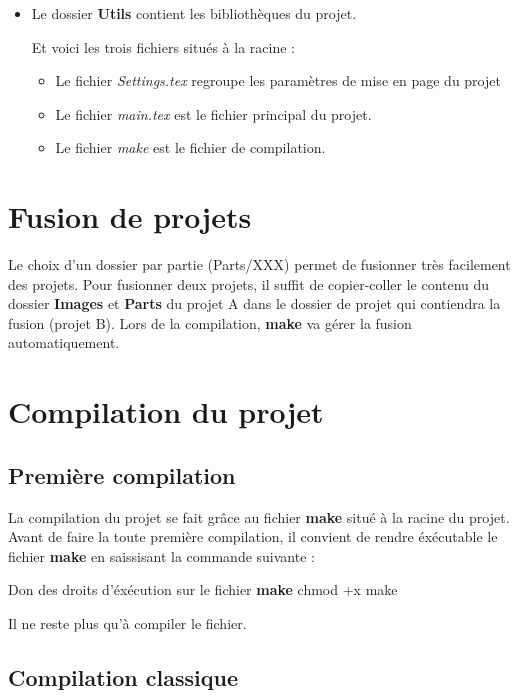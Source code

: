 \documentclass[12pt]{report}
\newcommand{\Triangle}{$\blacktriangleright$}
\newenvironment{items}[2]
{      
        \begin{itemize}[font=\color{#1}, label=#2]  
    }
    { 
        \end{itemize}
}%
\renewcommand{\bold}[1]{\textbf{#1}}
\newcommand{\italic}[1]{\textit{#1}}
\begin{document}
\begin{items}{blue}{\Triangle}
    \item Le dossier \bold{Utils} contient les bibliothèques du projet.

    Et voici les trois fichiers situés à la racine : 
    \begin{items}{black}{\Triangle}
        \item Le fichier \italic{Settings.tex} regroupe les paramètres de mise en page du projet
        \item Le fichier \italic{main.tex} est le fichier principal du projet.
        \item Le fichier \italic{make} est le fichier de compilation.
    \end{items}
\end{items}

\section{Fusion de projets}

Le choix d'un dossier par partie (Parts/XXX) permet de fusionner très facilement des projets.
Pour fusionner deux projets, il suffit de copier-coller le contenu du dossier \bold{Images} et \bold{Parts} du projet A dans le dossier de projet qui contiendra la fusion (projet B). Lors de la compilation, \bold{make} va gérer la fusion automatiquement.


\section{Compilation du projet}

\subsection{Première compilation}

La compilation du projet se fait grâce au fichier \bold{make} situé à la racine du projet.
Avant de faire la toute première compilation, il convient de rendre éxécutable le fichier \bold{make} en saissisant la commande suivante : 
    
\begin{Bash}{Don des droits d'éxécution sur le fichier \bold{make}}
chmod +x make
\end{Bash}

Il ne reste plus qu'à compiler le fichier.

\subsection{Compilation classique}
\end{document}
